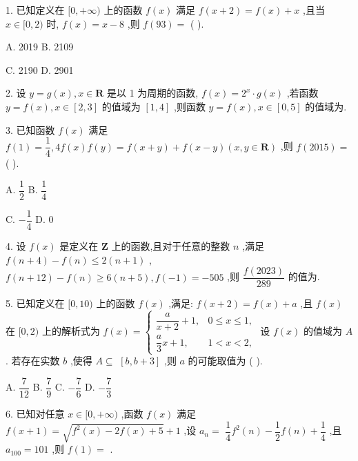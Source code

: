 1. 已知定义在 $\lbrack 0, + \infty )$ 上的函数 $f\left( x\right)$ 满足 $f\left( {x + 2}\right)  = f\left( x\right)  + x$ ,且当 $x \in  \lbrack 0,2)$ 时, $f\left( x\right)  = x - 8$ ,则 $f\left( {93}\right)  =$ (   ).

A. 2019 B. 2109

C. 2190 D. 2901

2. 设 $y = g\left( x\right) ,x \in  \mathbf{R}$ 是以 1 为周期的函数, $f\left( x\right)  = {2}^{x} \cdot  g\left( x\right)$ ,若函数 $y = f\left( x\right) ,x \in  \left\lbrack  {2,3}\right\rbrack$ 的值域为 $\left\lbrack  {1,4}\right\rbrack$ ,则函数 $y = f\left( x\right) ,x \in  \left\lbrack  {0,5}\right\rbrack$ 的值域为\blkda{}.

3. 已知函数 $f\left( x\right)$ 满足 $f\left( 1\right)  = \dfrac{1}{4},{4f}\left( x\right) f\left( y\right)  = f\left( {x + y}\right)  + f\left( {x - y}\right) \left( {x,y \in  \mathbf{R}}\right)$ ,则 $f\left( {2015}\right)  =$ (   ).

A. $\dfrac{1}{2}$ B. $\dfrac{1}{4}$

C. $- \dfrac{1}{4}$ D. 0

4. 设 $f\left( x\right)$ 是定义在 $\mathbf{Z}$ 上的函数,且对于任意的整数 $n$ ,满足 $f\left( {n + 4}\right)  - f\left( n\right)  \leq  2\left( {n + 1}\right)$ , $f\left( {n + {12}}\right)  - f\left( n\right)  \geq  6\left( {n + 5}\right) ,f\left( {-1}\right)  =  - {505}$ ,则 $\dfrac{f\left( {2023}\right) }{289}$ 的值为\blkda{}.

5. 已知定义在 $\lbrack 0,{10})$ 上的函数 $f\left( x\right)$ ,满足: $f\left( {x + 2}\right)  = f\left( x\right)  + a$ ,且 $f\left( x\right)$ 在 $\lbrack 0,2)$ 上的解析式为 $f\left( x\right)  = \left\{  \begin{array}{ll} \dfrac{a}{x + 2} + 1, & 0 \leq  x \leq  1, \\  \dfrac{a}{3}x + 1, & 1 < x < 2, \end{array}\right.$ 设 $f\left( x\right)$ 的值域为 $A$ . 若存在实数 $b$ ,使得 $A \subseteq$  $\left\lbrack  {b,b + 3}\right\rbrack$ ,则 $a$ 的可能取值为 (   ).

A. $\dfrac{7}{12}$ B. $\dfrac{7}{9}$ C. $- \dfrac{7}{6}$ D. $- \dfrac{7}{3}$

6. 已知对任意 $x \in  \lbrack 0, + \infty )$ ,函数 $f\left( x\right)$ 满足 $f\left( {x + 1}\right)  = \sqrt{{f}^{2}\left( x\right)  - {2f}\left( x\right)  + 5} + 1$ ,设 ${a}_{n} =$  $\dfrac{1}{4}{f}^{2}\left( n\right)  - \dfrac{1}{2}f\left( n\right)  + \dfrac{1}{4}$ ,且 ${a}_{100} = {101}$ ,则 $f\left( 1\right)  =$ \blkda{}.

